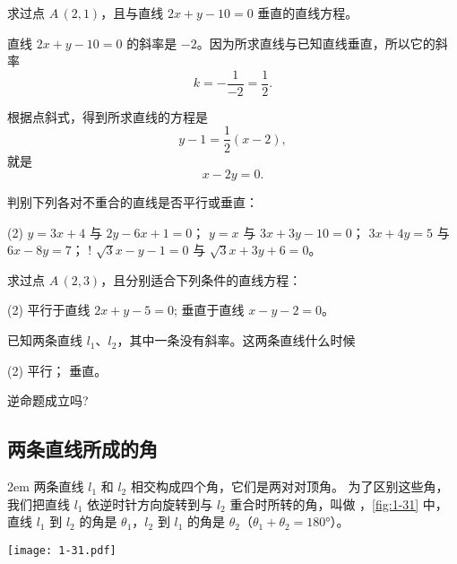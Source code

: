 \begin{example}
求过点 $A\,(2,1)$，且与直线 $2x+y-10=0$ 垂直的直线方程。
\end{example}

\begin{solution}
  直线 $2x+y-10=0$ 的斜率是 $-2$。因为所求直线与已知直线垂直，所以它的斜率
  \[ k= -\frac{1}{-2}=\frac{1}{2}.\]

  根据点斜式，得到所求直线的方程是
\[ y-1=\frac{1}{2}(x-2), \]
就是
\[ x-2y= 0. \]
\end{solution}

\begin{Practice}
  \begin{question}
    \item 判别下列各对不重合的直线是否平行或垂直：
    \begin{tasks}(2)
      \task $y=3x+4$ 与 $2y-6x+1=0$；
      \task $y=x$ 与 $3x+3y-10=0$；
      \task $3x+4y=5$ 与 $6x-8y=7$；
      \task! $\sqrt{3}x-y-1=0$ 与 $\sqrt{3}x+3y+6=0$。
    \end{tasks}
    \item 求过点 $A\,(2,3)$，且分别适合下列条件的直线方程：
    \begin{tasks}(2)
      \task 平行于直线 $2x+y-5=0$;
      \task 垂直于直线 $x-y-2=0$。
    \end{tasks}
    \item 已知两条直线 $l_1$、$l_2$，其中一条没有斜率。这两条直线什么时候
    \begin{tasks}(2)
      \task 平行；
      \task 垂直。
    \end{tasks}
    逆命题成立吗?
  \end{question}
\end{Practice}

\subsection{两条直线所成的角}
\medskip\noindent
\begin{minipage}{0.7\linewidth}\parindent2em
两条直线 $l_1$ 和 $l_2$ 相交构成四个角，它们是两对对顶角。
为了区别这些角，我们把直线 $l_1$ 依逆时针方向旋转到与 $l_2$ 重合时所转的角，叫做 ，\cref{fig:1-31} 中，直线 $l_1$ 到 $l_2$ 的角是 $\theta_1$，$l_2$ 到 $l_1$ 的角是 $\theta_2$（$\theta_1+\theta_2=\ang{180}$）。
\end{minipage}\hfill
\begin{minipage}{0.25\linewidth}\centering
\begin{figurehere}
  \texttt{[image: 1-31.pdf]}
  \caption{}\label{fig:1-31}
\end{figurehere}
\end{minipage}

